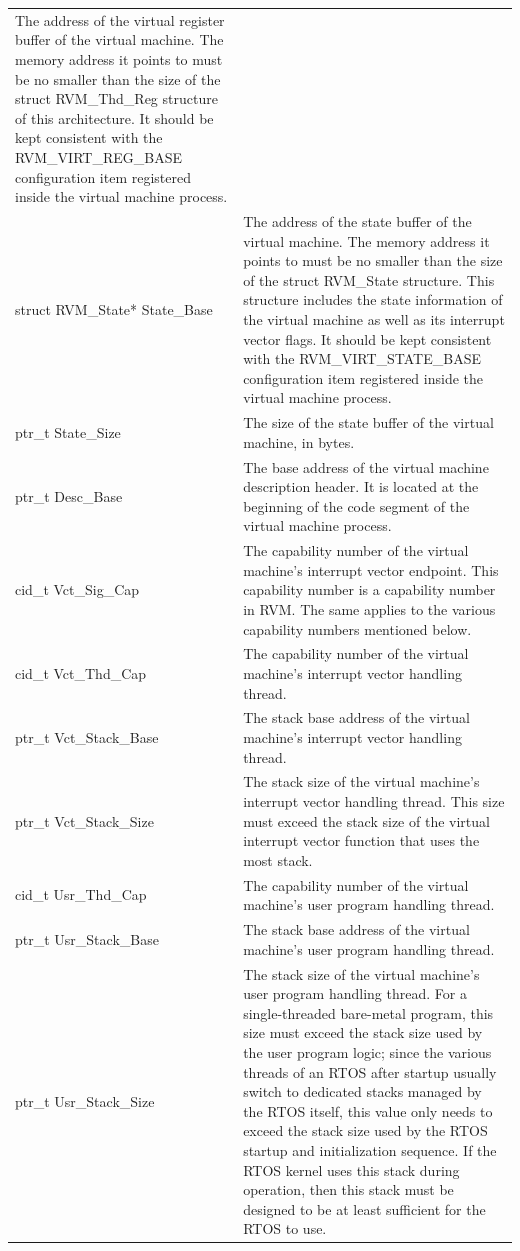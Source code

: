 \begin{xltabular}{\textwidth}{@{}>{\hsize\raggedright\arraybackslash}X>{\hsize\raggedright\arraybackslash}X@{}}
The address of the virtual register buffer of the virtual machine. The memory address it points to must be no smaller than the size of the struct RVM\_Thd\_Reg structure of this architecture. It should be kept consistent with the RVM\_VIRT\_REG\_BASE configuration item registered inside the virtual machine process.\tabularnewline
struct RVM\_\allowbreak{}State* State\_\allowbreak{}Base &
The address of the state buffer of the virtual machine. The memory address it points to must be no smaller than the size of the struct RVM\_State structure. This structure includes the state information of the virtual machine as well as its interrupt vector flags. It should be kept consistent with the RVM\_\allowbreak{}VIRT\_\allowbreak{}STATE\_\allowbreak{}BASE configuration item registered inside the virtual machine process.\tabularnewline
ptr\_\allowbreak{}t State\_\allowbreak{}Size & The size of the state buffer of the virtual machine, in bytes.\tabularnewline
ptr\_\allowbreak{}t Desc\_\allowbreak{}Base &
The base address of the virtual machine description header. It is located at the beginning of the code segment of the virtual machine process.\tabularnewline
cid\_\allowbreak{}t Vct\_\allowbreak{}Sig\_\allowbreak{}Cap &
The capability number of the virtual machine's interrupt vector endpoint. This capability number is a capability number in RVM. The same applies to the various capability numbers mentioned below.\tabularnewline
cid\_\allowbreak{}t Vct\_\allowbreak{}Thd\_\allowbreak{}Cap & The capability number of the virtual machine's interrupt vector handling thread.\tabularnewline
ptr\_\allowbreak{}t Vct\_\allowbreak{}Stack\_\allowbreak{}Base &
The stack base address of the virtual machine's interrupt vector handling thread.\tabularnewline
ptr\_\allowbreak{}t Vct\_\allowbreak{}Stack\_\allowbreak{}Size &
The stack size of the virtual machine's interrupt vector handling thread. This size must exceed the stack size of the virtual interrupt vector function that uses the most stack.\tabularnewline
cid\_\allowbreak{}t Usr\_\allowbreak{}Thd\_\allowbreak{}Cap & The capability number of the virtual machine's user program handling thread.\tabularnewline
ptr\_\allowbreak{}t Usr\_\allowbreak{}Stack\_\allowbreak{}Base &
The stack base address of the virtual machine's user program handling thread.\tabularnewline
ptr\_\allowbreak{}t Usr\_\allowbreak{}Stack\_\allowbreak{}Size &
The stack size of the virtual machine's user program handling thread. For a single-threaded bare-metal program, this size must exceed the stack size used by the user program logic; since the various threads of an RTOS after startup usually switch to dedicated stacks managed by the RTOS itself, this value only needs to exceed the stack size used by the RTOS startup and initialization sequence. If the RTOS kernel uses this stack during operation, then this stack must be designed to be at least sufficient for the RTOS to use.\tabularnewline
\end{xltabular}

